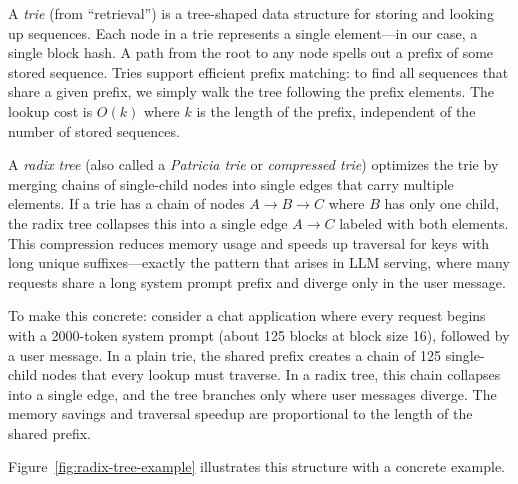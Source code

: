 %
A \emph{trie} (from ``retrieval'') is a tree-shaped data structure for storing and looking up sequences. Each node in a trie represents a single element---in our case, a single block hash. A path from the root to any node spells out a prefix of some stored sequence. Tries support efficient prefix matching: to find all sequences that share a given prefix, we simply walk the tree following the prefix elements. The lookup cost is $O(k)$ where $k$ is the length of the prefix, independent of the number of stored sequences.

A \emph{radix tree} (also called a \emph{Patricia trie} or \emph{compressed trie}) optimizes the trie by merging chains of single-child nodes into single edges that carry multiple elements. If a trie has a chain of nodes $A \to B \to C$ where $B$ has only one child, the radix tree collapses this into a single edge $A \to C$ labeled with both elements. This compression reduces memory usage and speeds up traversal for keys with long unique suffixes---exactly the pattern that arises in LLM serving, where many requests share a long system prompt prefix and diverge only in the user message.

To make this concrete: consider a chat application where every request begins with a 2000-token system prompt (about 125 blocks at block size 16), followed by a user message. In a plain trie, the shared prefix creates a chain of 125 single-child nodes that every lookup must traverse. In a radix tree, this chain collapses into a single edge, and the tree branches only where user messages diverge. The memory savings and traversal speedup are proportional to the length of the shared prefix.

Figure~\ref{fig:radix-tree-example} illustrates this structure with a concrete example.

